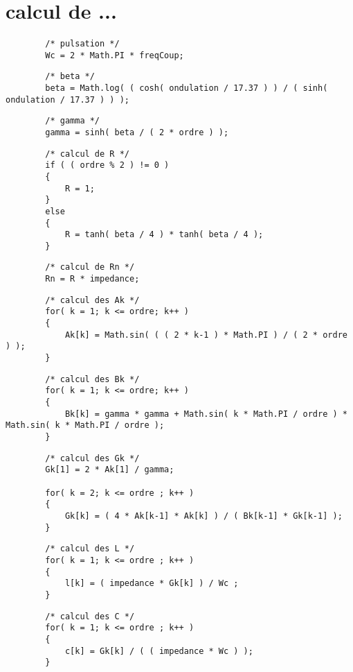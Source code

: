 \documentclass[a4paper,11pt]{article}
\begin{document}
\section{calcul de ... }
    \paragraph{}


    \begin{lstlisting}
        /* pulsation */
        Wc = 2 * Math.PI * freqCoup;
    \end{lstlisting}


    \begin{lstlisting}
        /* beta */
        beta = Math.log( ( cosh( ondulation / 17.37 ) ) / ( sinh( ondulation / 17.37 ) ) );
    \end{lstlisting}


    \begin{lstlisting}
        /* gamma */
        gamma = sinh( beta / ( 2 * ordre ) );
    \end{lstlisting}


    \begin{lstlisting}
        /* calcul de R */
        if ( ( ordre % 2 ) != 0 )
        {
            R = 1;
        }
        else
        {
            R = tanh( beta / 4 ) * tanh( beta / 4 );
        }
    \end{lstlisting}


    \begin{lstlisting}
        /* calcul de Rn */
        Rn = R * impedance;
    \end{lstlisting}


    \begin{lstlisting}
        /* calcul des Ak */
        for( k = 1; k <= ordre; k++ )
        {
            Ak[k] = Math.sin( ( ( 2 * k-1 ) * Math.PI ) / ( 2 * ordre ) );
        }
    \end{lstlisting}


    \begin{lstlisting}
        /* calcul des Bk */
        for( k = 1; k <= ordre; k++ )
        {
            Bk[k] = gamma * gamma + Math.sin( k * Math.PI / ordre ) * Math.sin( k * Math.PI / ordre );
        }
    \end{lstlisting}


    \begin{lstlisting}
        /* calcul des Gk */
        Gk[1] = 2 * Ak[1] / gamma;

        for( k = 2; k <= ordre ; k++ )
        {
            Gk[k] = ( 4 * Ak[k-1] * Ak[k] ) / ( Bk[k-1] * Gk[k-1] );
        }
    \end{lstlisting}


    \begin{lstlisting}
        /* calcul des L */
        for( k = 1; k <= ordre ; k++ )
        {
            l[k] = ( impedance * Gk[k] ) / Wc ;
        }
    \end{lstlisting}


    \begin{lstlisting}
        /* calcul des C */
        for( k = 1; k <= ordre ; k++ )
        {
            c[k] = Gk[k] / ( ( impedance * Wc ) );
        }
    \end{lstlisting}
\end{document}

